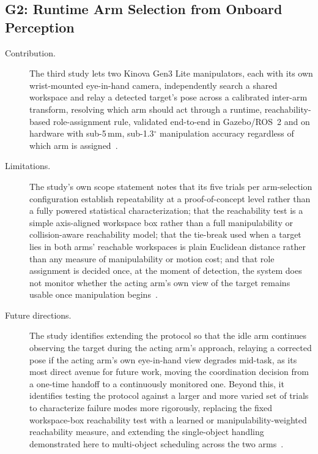 \subsection{G2: Runtime Arm Selection from Onboard Perception}\label{sec:concl_g2}

\begin{description}
    \item[Contribution.] The third study lets two Kinova Gen3 Lite manipulators, each with its own
    wrist-mounted eye-in-hand camera, independently search a shared workspace and relay a detected
    target's pose across a calibrated inter-arm transform, resolving which arm should act through a
    runtime, reachability-based role-assignment rule, validated end-to-end in Gazebo/ROS~2 and on
    hardware with sub-5\,mm, sub-1.3$^\circ$ manipulation accuracy regardless of which arm is
    assigned~\citep{sk2025sharedvision}.

    \item[Limitations.] The study's own scope statement notes that its five trials per arm-selection
    configuration establish repeatability at a proof-of-concept level rather than a fully powered
    statistical characterization; that the reachability test is a simple axis-aligned workspace box
    rather than a full manipulability or collision-aware reachability model; that the tie-break used
    when a target lies in both arms' reachable workspaces is plain Euclidean distance rather than any
    measure of manipulability or motion cost; and that role assignment is decided once, at the moment
    of detection, the system does not monitor whether the acting arm's own view of the target remains
    usable once manipulation begins~\citep{sk2025sharedvision}.

    \item[Future directions.] The study identifies extending the protocol so that the idle arm
    continues observing the target during the acting arm's approach, relaying a corrected pose if the
    acting arm's own eye-in-hand view degrades mid-task, as its most direct avenue for future work,
    moving the coordination decision from a one-time handoff to a continuously monitored one. Beyond
    this, it identifies testing the protocol against a larger and more varied set of trials to
    characterize failure modes more rigorously, replacing the fixed workspace-box reachability test
    with a learned or manipulability-weighted reachability measure, and extending the single-object
    handling demonstrated here to multi-object scheduling across the two
    arms~\citep{sk2025sharedvision}.
\end{description}

